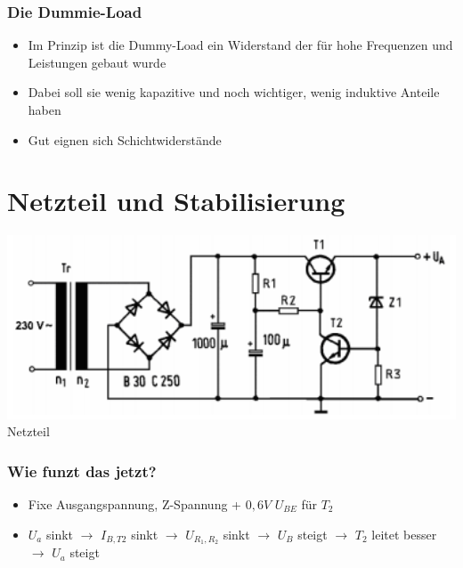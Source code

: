 \begin{frame}
\frametitle{Die Dummie-Load}
\begin{itemize}
	\item	Im Prinzip ist die Dummy-Load ein Widerstand der für hohe Frequenzen und Leistungen gebaut wurde
	\item	Dabei soll sie wenig kapazitive und noch wichtiger, wenig induktive Anteile haben
	\item	Gut eignen sich Schichtwiderstände 
\end{itemize}
\end{frame}

\section*{Netzteil und Stabilisierung}
\begin{frame}
    \begin{center}
        \includegraphics[width=1\textwidth]{a17/TD306.png}\\
       Netzteil \cite{bna}
    \end{center}
\end{frame}

\begin{frame}
\frametitle{Wie funzt das jetzt?}
\begin{itemize}
	\item	Fixe Ausgangspannung, Z-Spannung + $0,6V$ $U_{BE}$ für $T_2$
	\item	$U_a$ sinkt $\rightarrow$	$I_{B,T2}$ sinkt $\rightarrow$ $U_{R_1,R_2}$ sinkt $\rightarrow$ $U_B$ steigt $\rightarrow$ $T_2$ leitet besser $\rightarrow$ $U_a$ steigt
\end{itemize}
\end{frame}

